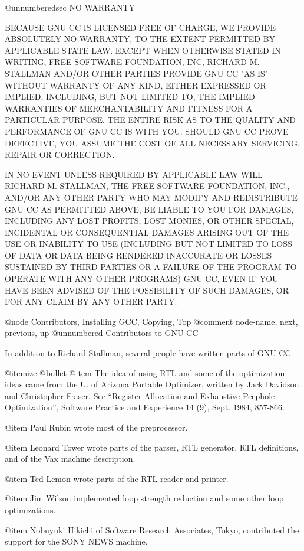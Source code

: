 @unnumberedsec NO WARRANTY

  BECAUSE GNU CC IS LICENSED FREE OF CHARGE, WE PROVIDE ABSOLUTELY NO
WARRANTY, TO THE EXTENT PERMITTED BY APPLICABLE STATE LAW.  EXCEPT
WHEN OTHERWISE STATED IN WRITING, FREE SOFTWARE FOUNDATION, INC,
RICHARD M. STALLMAN AND/OR OTHER PARTIES PROVIDE GNU CC "AS IS" WITHOUT
WARRANTY OF ANY KIND, EITHER EXPRESSED OR IMPLIED, INCLUDING, BUT NOT
LIMITED TO, THE IMPLIED WARRANTIES OF MERCHANTABILITY AND FITNESS FOR
A PARTICULAR PURPOSE.  THE ENTIRE RISK AS TO THE QUALITY AND
PERFORMANCE OF GNU CC IS WITH YOU.  SHOULD GNU CC PROVE DEFECTIVE, YOU
ASSUME THE COST OF ALL NECESSARY SERVICING, REPAIR OR CORRECTION.

 IN NO EVENT UNLESS REQUIRED BY APPLICABLE LAW WILL RICHARD M.
STALLMAN, THE FREE SOFTWARE FOUNDATION, INC., AND/OR ANY OTHER PARTY
WHO MAY MODIFY AND REDISTRIBUTE GNU CC AS PERMITTED ABOVE, BE LIABLE TO
YOU FOR DAMAGES, INCLUDING ANY LOST PROFITS, LOST MONIES, OR OTHER
SPECIAL, INCIDENTAL OR CONSEQUENTIAL DAMAGES ARISING OUT OF THE USE OR
INABILITY TO USE (INCLUDING BUT NOT LIMITED TO LOSS OF DATA OR DATA
BEING RENDERED INACCURATE OR LOSSES SUSTAINED BY THIRD PARTIES OR A
FAILURE OF THE PROGRAM TO OPERATE WITH ANY OTHER PROGRAMS) GNU CC, EVEN
IF YOU HAVE BEEN ADVISED OF THE POSSIBILITY OF SUCH DAMAGES, OR FOR
ANY CLAIM BY ANY OTHER PARTY.

@node     Contributors, Installing GCC, Copying,   Top
@comment  node-name,    next,         previous,  up
@unnumbered Contributors to GNU CC

In addition to Richard Stallman, several people have written parts
of GNU CC.

@itemize @bullet
@item
The idea of using RTL and some of the optimization ideas came from the
U. of Arizona Portable Optimizer, written by Jack Davidson and
Christopher Fraser.  See ``Register Allocation and Exhaustive Peephole
Optimization'', Software Practice and Experience 14 (9), Sept. 1984,
857-866.

@item
Paul Rubin wrote most of the preprocessor.

@item
Leonard Tower wrote parts of the parser, RTL generator, RTL
definitions, and of the Vax machine description.

@item
Ted Lemon wrote parts of the RTL reader and printer.

@item
Jim Wilson implemented loop strength reduction and some other
loop optimizations.

@item
Nobuyuki Hikichi of Software Research Associates, Tokyo, contributed
the support for the SONY NEWS machine.


